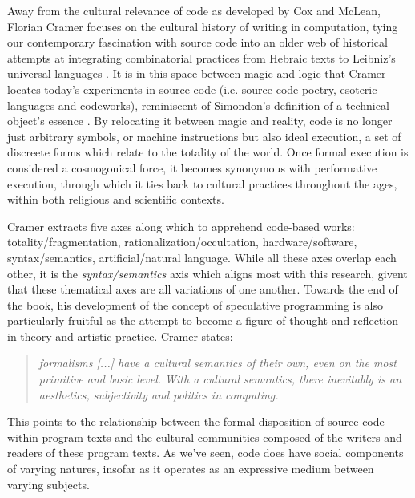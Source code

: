 Away from the cultural relevance of code as developed by Cox and McLean, Florian Cramer focuses on the cultural history of writing in computation, tying our contemporary fascination with source code into an older web of historical attempts at integrating combinatorial practices from Hebraic texts to Leibniz's universal languages \citep{cramer_words_2003}. It is in this space between magic and logic that Cramer locates today's experiments in source code (i.e. source code poetry, esoteric languages and codeworks), reminiscent of Simondon's definition of a technical object's essence \citep{simondon_mode_1958}. By relocating it between magic and reality, code is no longer just arbitrary symbols, or machine instructions but also ideal execution, a set of discreete forms which relate to the totality of the world. Once formal execution is considered a cosmogonical force, it becomes synonymous with performative execution, through which it ties back to cultural practices throughout the ages, within both religious and scientific contexts.

Cramer extracts five axes along which to apprehend code-based works: totality/fragmentation, rationalization/occultation, hardware/software, syntax/semantics, artificial/natural language. While all these axes overlap each other, it is the \emph{syntax/semantics} axis which aligns most with this research, givent that these thematical axes are all variations of one another. Towards the end of the book, his development of the concept of speculative programming is also particularly fruitful as the attempt to become a figure of thought and reflection in theory and artistic practice. Cramer states:

\begin{quote}
    \emph{formalisms [...] have a cultural semantics of their own, even on the most primitive and basic level. With a cultural semantics, there inevitably is an aesthetics, subjectivity and politics in computing.} \citep{cramer_words_2003}
\end{quote}

This points to the relationship between the formal disposition of source code within program texts and the cultural communities composed of the writers and readers of these program texts. As we've seen, code does have social components of varying natures, insofar as it operates as an expressive medium between varying subjects.

